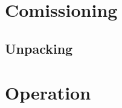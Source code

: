 \documentclass[11pt]{report}
\begin{document}
	
\chapter{Comissioning}
\section{Unpacking}
\blindtext
\chapter{Operation}
\blindtext
\end{document}
